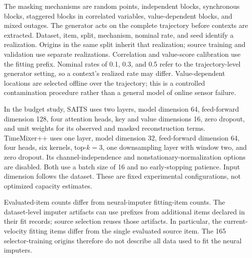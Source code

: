 The masking mechanisms are random points, independent blocks, synchronous blocks, staggered blocks in correlated variables, value-dependent blocks, and mixed outages. The generator acts on the complete trajectory before contexts are extracted. Dataset, item, split, mechanism, nominal rate, and seed identify a realization. Origins in the same split inherit that realization; source training and validation use separate realizations. Correlation and value-score calibration use the fitting prefix. Nominal rates of 0.1, 0.3, and 0.5 refer to the trajectory-level generator setting, so a context's realized rate may differ. Value-dependent locations are selected offline over the trajectory; this is a controlled contamination procedure rather than a general model of online sensor failure.

In the budget study, SAITS uses two layers, model dimension 64, feed-forward dimension 128, four attention heads, key and value dimensions 16, zero dropout, and unit weights for its observed and masked reconstruction terms. TimeMixer++ uses one layer, model dimension 32, feed-forward dimension 64, four heads, six kernels, top-$k=3$, one downsampling layer with window two, and zero dropout. Its channel-independence and nonstationary-normalization options are disabled. Both use a batch size of 16 and no early-stopping patience. Input dimension follows the dataset. These are fixed experimental configurations, not optimized capacity estimates.

Evaluated-item counts differ from neural-imputer fitting-item counts. The dataset-level imputer artifacts can use prefixes from additional items declared in their fit records; source selection reuses those artifacts. In particular, the current-velocity fitting items differ from the single evaluated source item. The 165 selector-training origins therefore do not describe all data used to fit the neural imputers.



